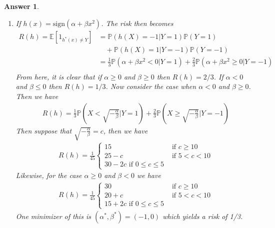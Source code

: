 \documentclass[12pt]{article}
\theoremstyle{colon}
\newtheorem*{answer}{Answer}
\begin{document}
\begin{answer}
\begin{enumerate}[label=\alph*)]
    \item If $h(x) = \text{sign}(\alpha + \beta x^2)$. The risk then becomes
      \begin{align*}
        R(h) = \mathbb{E}[1_{h^*(x) \neq Y}] &= \mathbb{P}(h(X) = -1 | Y = 1)\mathbb{P}(Y = 1)\\
        &\quad + \mathbb{P}(h(X) = 1 | Y = -1)\mathbb{P}(Y = -1) \\
        &= \frac{1}{3} \mathbb{P}(\alpha + \beta x^2 < 0 | Y = 1) + \frac{2}{3} \mathbb{P}(\alpha + \beta x^2 \geq 0 | Y = -1) \\
      \end{align*}
      From here, it is clear that if $\alpha \geq 0$ and $\beta \geq 0$ then $R(h) = 2/3$. If $\alpha < 0$ and $\beta \leq 0$ then $R(h) = 1/3$. Now consider the case when $\alpha < 0$ and $\beta \geq 0$. Then we have
      \begin{gather*}
        R(h) = \frac{1}{3} \mathbb{P}(X < \sqrt{-\frac{\alpha}{\beta}} | Y = 1) + \frac{2}{3} \mathbb{P}(X \geq \sqrt{-\frac{\alpha}{\beta}} | Y = -1)
      \end{gather*}
      Then suppose that $\sqrt{-\frac{\alpha}{\beta}} = c$, then we have
      \begin{gather*}
        R(h) = \frac{1}{45}\begin{cases}
          15 & \text{ if } c \geq 10 \\
          25 - c & \text{ if } 5 < c < 10 \\
          30 - 2c \text{ if } 0 \leq c \leq 5
        \end{cases}
      \end{gather*}
      Likewise, for the case $\alpha \geq 0$ and $\beta < 0$ we have
      \begin{gather*}
        R(h) = \frac{1}{45}\begin{cases}
          30 & \text{ if } c \geq 10 \\
          20 + c & \text{ if } 5 < c < 10 \\
          15 + 2c \text{ if } 0 \leq c \leq 5
        \end{cases}
      \end{gather*}
      One minimizer of this is $(\alpha^*, \beta^*) = (-1,0)$ which yields a risk of 1/3.


\end{enumerate}
\end{answer}
\end{document}
